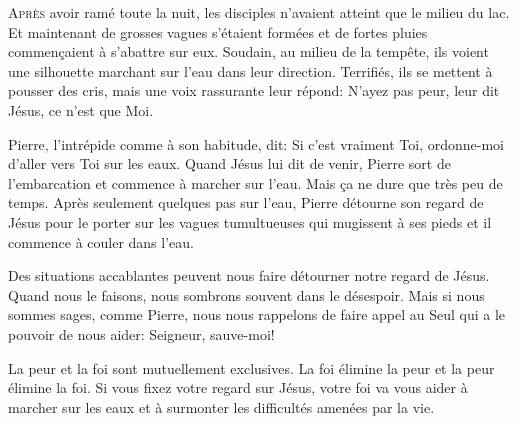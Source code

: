 


\lettrine{A}{près} avoir ramé toute la nuit,
 les disciples n'avaient atteint que le milieu du lac.
 Et maintenant de grosses vagues s'étaient formées et de fortes pluies
 commen\c{c}aient à s'abattre sur eux. Soudain, au milieu de la tempête,
 ils voient une silhouette marchant sur l'eau dans leur direction.
 Terrifiés, ils se mettent à pousser des cris,
 mais une voix rassurante leur répond:
 \Og N'ayez pas peur, leur dit Jésus, ce n'est que Moi. \Fg{}


Pierre, l'intrépide  comme à son habitude, dit: 
 \Og Si c'est vraiment Toi, ordonne-moi d'aller vers Toi sur les eaux. \Fg{}
 Quand Jésus lui dit de venir, Pierre sort de l'embarcation et commence
 à marcher sur l'eau. Mais \c{c}a ne dure que très peu de temps.
 Après seulement quelques pas sur l'eau, Pierre détourne son  regard
 de Jésus pour le porter sur les vagues tumultueuses qui mugissent à ses pieds
 et il commence à couler dans l'eau.

Des situations accablantes peuvent nous faire détourner notre regard de Jésus.
 Quand nous le faisons, nous sombrons souvent dans le désespoir.
 Mais si nous sommes sages, comme Pierre, nous nous rappelons
 de faire appel au Seul qui a le pouvoir de nous aider:
 \Og Seigneur, sauve-moi! \Fg{}

La peur et la foi sont mutuellement exclusives. La foi élimine la peur
 et la peur élimine la foi. Si vous fixez votre regard sur Jésus,
 votre foi va vous aider à marcher sur les eaux et à surmonter
 les difficultés amenées par la vie. 

\dvrule



